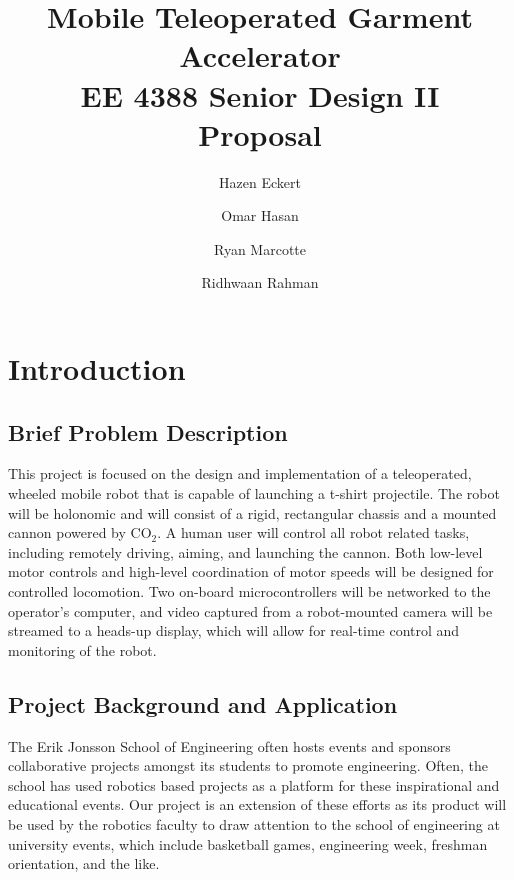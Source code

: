 \documentclass[letterpaper,12pt]{article}
\begin{document}
\title{\textbf{Mobile Teleoperated Garment Accelerator}\\EE 4388 Senior Design II\\Proposal}
\author{Hazen Eckert \and Omar Hasan \and Ryan Marcotte \and Ridhwaan Rahman}
\maketitle
\newpage

\section{Introduction}
\subsection{Brief Problem Description}
This project is focused on the design and implementation of a teleoperated, wheeled mobile robot that is capable of launching a t-shirt projectile. The robot will be holonomic and will consist of a rigid, rectangular chassis and a mounted cannon powered by $\textrm{CO}_2$. A human user will control all robot related tasks, including remotely driving, aiming, and launching the cannon. Both low-level motor controls and high-level coordination of motor speeds will be designed for controlled locomotion. Two on-board microcontrollers will be networked to the operator's computer, and video captured from a robot-mounted camera will be streamed to a heads-up display, which will allow for real-time control and monitoring of the robot. 

\subsection{Project Background and Application}
The Erik Jonsson School of Engineering often hosts events and sponsors collaborative projects amongst its students to promote engineering. Often, the school has used robotics based projects as a platform for these inspirational and educational events. Our project is an extension of these efforts as its product will be used by the robotics faculty to draw attention to the school of engineering at university events, which include basketball games, engineering week, freshman orientation, and the like.
\end{document}
